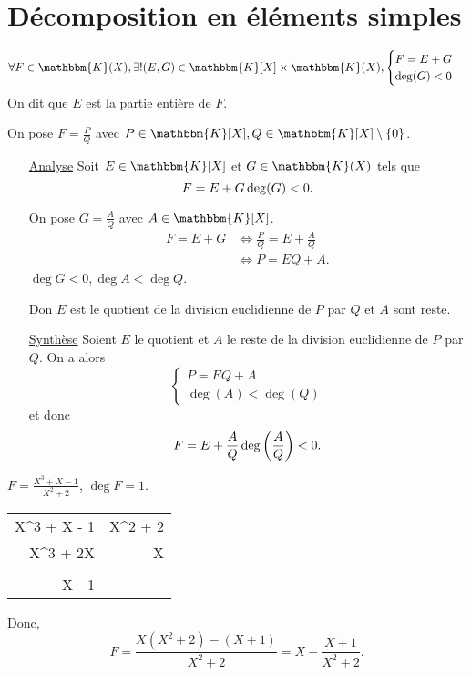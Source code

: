 \part{Décomposition en éléments simples}

\begin{lem}
	\[
		\forall F \in \mathbbm{K}(X), \exists! (E,G) \in \mathbbm{K}[X] \times \mathbbm{K}(X),
		\begin{cases}
			F = E + G\\
			\deg(G) < 0
		\end{cases}
	\]
	On dit que $E$ est la \underline{partie entière} de $F$.
\end{lem}

\begin{prv}
	On pose $F = \frac{P}{Q}$ avec $P \in \mathbbm{K}[X], Q \in \mathbbm{K}[X]\setminus \{0\}$.
	\begin{itemize}
		\item[\underline{\sc Analyse}] Soit $E \in \mathbbm{K}[X]$ et $G \in \mathbbm{K}(X)$ tels que \[
				F = E + G\\
				\deg(G) < 0.
			\]

			On pose $G = \frac{A}{Q}$ avec $A \in \mathbbm{K}[X]$.
			\begin{align*}
				F = E + G &\iff \frac{P}{Q} = E + \frac{A}{Q}\\
				&\iff P = EQ + A.
			\end{align*}
			$\deg G < 0, \deg A < \deg Q$.

			Don $E$ est le quotient de la division euclidienne de $P$ par $Q$ et $A$ sont reste.
		\item[\underline{\sc Synthèse}] Soient $E$ le quotient et $A$ le reste de la division euclidienne de $P$ par $Q$. On a alors \[
			\begin{cases}
				P = EQ + A\\
				\deg(A) < \deg(Q)
			\end{cases}
		\] et donc \[
			F = E + \frac{A}{Q}\\
			\deg\left( \frac{A}{Q} \right) < 0.
		\]
	\end{itemize}
\end{prv}

\begin{exm}
	$F = \frac{X^3 + X - 1}{X^2+2}$, $\deg F = 1$.\\
	\begin{center}
		\begin{tabular}{D|D}
			X^3 + X - 1 & X^2 + 2\\ 
			\raisesign{-}
			X^3 + 2X & X\\  \\[\dimexpr-\normalbaselineskip+\jot]
			-X - 1\\
		\end{tabular}
	\end{center}
	Donc, \[
		F = \frac{X(X^2+2) - (X+1)}{X^2+2} = X - \frac{X+1}{X^2+2}.
	\]
\end{exm}

